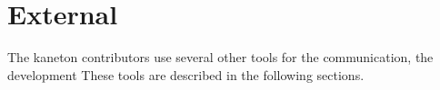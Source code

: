 \section{External}

The kaneton contributors use several other tools for the communication, the
development \etc{} These tools are described in the following sections.












